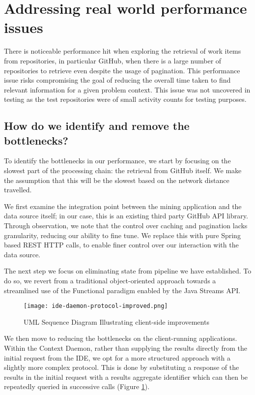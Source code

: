\section{Addressing real world performance issues}

There is noticeable performance hit when exploring the retrieval of work items from repositories, in particular GitHub, when there is a large number of repositories to retrieve even despite the usage of pagination. This performance issue risks compromising the goal of reducing the overall time taken to find relevant information for a given problem context. This issue was not uncovered in testing as the test repositories were of small activity counts for testing purposes. 

\subsection{How do we identify and remove the bottlenecks?}

To identify the bottlenecks in our performance, we start by focusing on the slowest part of the processing chain: the retrieval from GitHub itself. We make the assumption that this will be the slowest based on the network distance travelled.

We first examine the integration point between the mining application and the data source itself; in our case, this is an existing third party GitHub API library. Through observation, we note that the control over caching and pagination lacks granularity, reducing our ability to fine tune. We replace this with pure Spring based REST HTTP calls, to enable finer control over our interaction with the data source.

The next step we focus on eliminating state from pipeline we have established. To do so, we revert from a traditional object-oriented approach towards a streamlined use of the Functional paradigm enabled by the Java Streams API.


\begin{figure}[h!]
	\centering
	\texttt{[image: ide-daemon-protocol-improved.png]}
	\caption{UML Sequence Diagram Illustrating client-side improvements}
	\label{fig:ideDaemonProtocolImproved}
\end{figure}

We then move to reducing the bottlenecks on the client-running applications. Within the Context Daemon, rather than supplying the results directly from the initial request from the IDE, we opt for a more structured approach with a slightly more complex protocol. This is done by substituting a response of the results in the initial request with a results aggregate identifier which can then be repeatedly queried in successive calls (Figure \ref{fig:ideDaemonProtocolImproved}).

